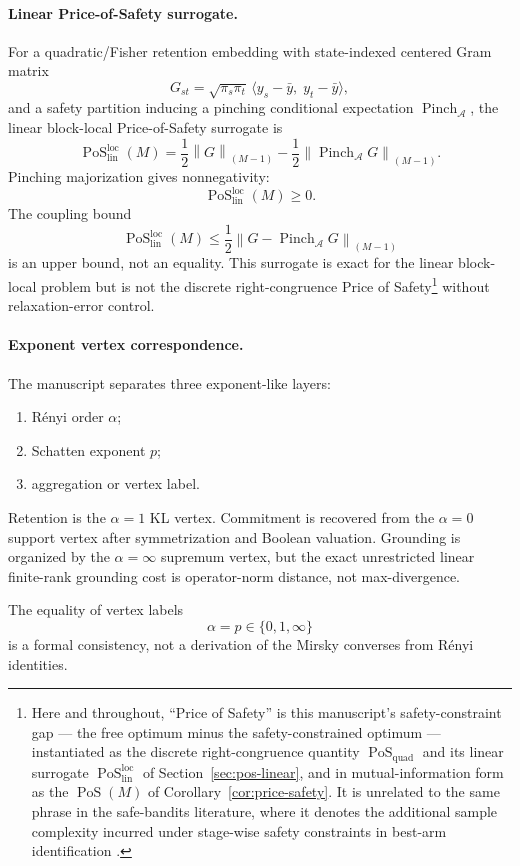 \documentclass[12pt]{article}
\theoremstyle{definition}
\DeclareMathOperator{\PoS}{PoS}
\newcommand{\EA}{\operatorname{Pinch}_{\mathcal A}}
\newcommand{\KyF}[2]{\left\|#1\right\|_{(#2)}}
\newcommand{\PoSlin}{\PoS_{\mathrm{lin}}^{\mathrm{loc}}}
\newcommand{\PoSquad}{\PoS_{\mathrm{quad}}}
\begin{document}
\paragraph{Linear Price-of-Safety surrogate.}
For a quadratic/Fisher retention embedding with state-indexed centered Gram
matrix
\[
G_{st}
=
\sqrt{\pi_s\pi_t}\,
\langle y_s-\bar y,\;y_t-\bar y\rangle,
\]
and a safety partition inducing a pinching conditional expectation
$\EA$, the linear block-local Price-of-Safety surrogate is
\[
\PoSlin(M)
=
\frac12\KyF{G}{M-1}
-
\frac12\KyF{\EA G}{M-1}.
\]
Pinching majorization gives nonnegativity:
\[
\PoSlin(M)\ge0.
\]
The coupling bound
\[
\PoSlin(M)
\le
\frac12\KyF{G-\EA G}{M-1}
\]
is an upper bound, not an equality.  This surrogate is exact for the linear
block-local problem but is not the discrete right-congruence Price of
Safety\footnote{Here and throughout, ``Price of Safety'' is this manuscript's
safety-constraint gap --- the free optimum minus the safety-constrained
optimum --- instantiated as the discrete right-congruence quantity $\PoSquad$
and its linear surrogate $\PoSlin$ of Section~\ref{sec:pos-linear}, and in
mutual-information form as the $\operatorname{PoS}(M)$ of
Corollary~\ref{cor:price-safety}.  It is unrelated to the same phrase in the
safe-bandits literature, where it denotes the additional sample complexity
incurred under stage-wise safety constraints in best-arm identification
\cite{shang2023}.}
without relaxation-error control.

\paragraph{Exponent vertex correspondence.}
The manuscript separates three exponent-like layers:
\begin{enumerate}[nosep,label=(\arabic*)]
\item R\'enyi order $\alpha$;
\item Schatten exponent $p$;
\item aggregation or vertex label.
\end{enumerate}

Retention is the $\alpha=1$ KL vertex.  Commitment is recovered from the
$\alpha=0$ support vertex after symmetrization and Boolean valuation.
Grounding is organized by the $\alpha=\infty$ supremum vertex, but the exact
unrestricted linear finite-rank grounding cost is operator-norm distance, not
max-divergence.

The equality of vertex labels
\[
\alpha=p\in\{0,1,\infty\}
\]
is a formal consistency, not a derivation of the Mirsky converses from
R\'enyi identities.
\end{document}
